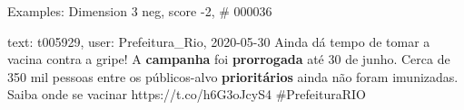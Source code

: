 \begin{frame}{Examples: Dimension 3 neg, score -2, \# 000036}
\footnotesize
\begin{alertblock}{text: t005929, user: Prefeitura\_Rio, 2020-05-30}
Ainda dá tempo de tomar a vacina contra a gripe!  
 A \textbf{campanha} foi \textbf{prorrogada} até 30 de 
junho. Cerca de 350 mil pessoas entre os públicos-alvo \textbf{prioritários} 
ainda não foram imunizadas. Saiba onde se vacinar  
https://t.co/h6G3oJcyS4 \#PrefeituraRIO 
\end{alertblock}
\end{frame}
